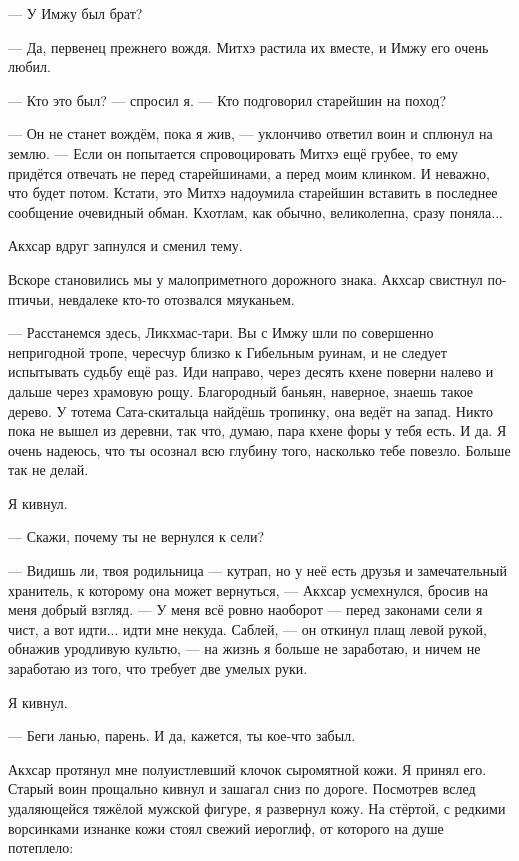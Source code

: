 --- У Имжу был брат?

--- Да, первенец прежнего вождя.
Митхэ растила их вместе, и Имжу его очень любил.

--- Кто это был? --- спросил я.
--- Кто подговорил старейшин на поход?

--- Он не станет вождём, пока я жив, --- уклончиво ответил воин и сплюнул на землю.
--- Если он попытается спровоцировать Митхэ ещё грубее, то ему придётся отвечать не перед старейшинами, а перед моим клинком.
И неважно, что будет потом.
Кстати, это Митхэ надоумила старейшин вставить в последнее сообщение очевидный обман.
Кхотлам, как обычно, великолепна, сразу поняла...

Акхсар вдруг запнулся и сменил тему.

Вскоре становились мы у малоприметного дорожного знака.
Акхсар свистнул по-птичьи, невдалеке кто-то отозвался мяуканьем.

--- Расстанемся здесь, Ликхмас-тари.
Вы с Имжу шли по совершенно непригодной тропе, чересчур близко к Гибельным руинам, и не следует испытывать судьбу ещё раз.
Иди направо, через десять кхене поверни налево и дальше через храмовую рощу.
Благородный баньян, наверное, знаешь такое дерево.
У тотема Сата-скитальца найдёшь тропинку, она ведёт на запад.
Никто пока не вышел из деревни, так что, думаю, пара кхене форы у тебя есть.
И да.
Я очень надеюсь, что ты осознал всю глубину того, насколько тебе повезло.
Больше так не делай.

Я кивнул.

--- Скажи, почему ты не вернулся к сели?

--- Видишь ли, твоя родильница --- кутрап, но у неё есть друзья и замечательный хранитель, к которому она может вернуться, --- Акхсар усмехнулся, бросив на меня добрый взгляд.
--- У меня всё ровно наоборот --- перед законами сели я чист, а вот идти... идти мне некуда.
Саблей, --- он откинул плащ левой рукой, обнажив уродливую культю, --- на жизнь я больше не заработаю, и ничем не заработаю из того, что требует две умелых руки.

Я кивнул.

--- Беги ланью, парень.
И да, кажется, ты кое-что забыл.

Акхсар протянул мне полуистлевший клочок сыромятной кожи.
Я принял его.
Старый воин прощально кивнул и зашагал сниз по дороге.
Посмотрев вслед удаляющейся тяжёлой мужской фигуре, я развернул кожу.
На стёртой, с редкими ворсинками изнанке кожи стоял свежий иероглиф, от которого на душе потеплело:

